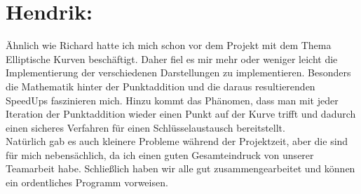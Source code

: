 \section*{Hendrik:}
Ähnlich wie Richard hatte ich mich schon vor dem Projekt mit dem Thema Elliptische Kurven beschäftigt. Daher fiel es mir mehr oder weniger leicht die Implementierung der verschiedenen Darstellungen zu implementieren. Besonders die Mathematik hinter der Punktaddition und die daraus resultierenden SpeedUps faszinieren mich. Hinzu kommt das Phänomen, dass man mit jeder Iteration der Punktaddition wieder einen Punkt auf der Kurve trifft und dadurch einen sicheres Verfahren für einen Schlüsselaustausch bereitstellt.\\
Natürlich gab es auch kleinere Probleme während der Projektzeit, aber die sind für mich nebensächlich, da ich einen guten Gesamteindruck von unserer Teamarbeit habe. Schließlich haben wir alle gut zusammengearbeitet und können ein ordentliches Programm vorweisen.

